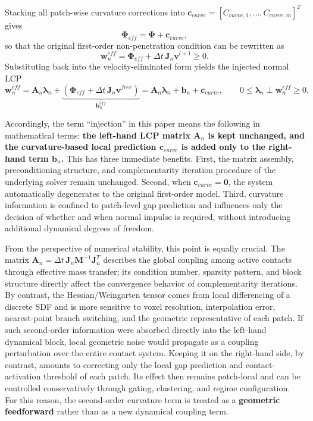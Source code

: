 Stacking all patch-wise curvature corrections into $\mathbf{c}_{curve}=[C_{curve,1},\ldots,C_{curve,m}]^T$ gives
\begin{equation}
    \boldsymbol{\Phi}_{eff} = \boldsymbol{\Phi} + \mathbf{c}_{curve},
\end{equation}
so that the original first-order non-penetration condition can be rewritten as
\begin{equation}
    \mathbf{w}_n^{eff} = \boldsymbol{\Phi}_{eff} + \Delta t\,\mathbf{J}_n \mathbf{v}^{l+1} \ge 0.
\end{equation}
Substituting back into the velocity-eliminated form yields the injected normal LCP
\begin{equation}
    \mathbf{w}_n^{eff}
    =
    \mathbf{A}_n \boldsymbol{\lambda}_n
    +
    \underbrace{\left(\boldsymbol{\Phi}_{eff} + \Delta t\,\mathbf{J}_n \mathbf{v}^{free}\right)}_{\mathbf{b}_n^{eff}}
    =
    \mathbf{A}_n \boldsymbol{\lambda}_n + \mathbf{b}_n + \mathbf{c}_{curve},
    \qquad
    0 \le \boldsymbol{\lambda}_n \perp \mathbf{w}_n^{eff} \ge 0.
\end{equation}

Accordingly, the term ``injection'' in this paper means the following in mathematical terms: \textbf{the left-hand LCP matrix $\mathbf{A}_n$ is kept unchanged, and the curvature-based local prediction $\mathbf{c}_{curve}$ is added only to the right-hand term $\mathbf{b}_n$.} This has three immediate benefits. First, the matrix assembly, preconditioning structure, and complementarity iteration procedure of the underlying solver remain unchanged. Second, when $\mathbf{c}_{curve}=\mathbf{0}$, the system automatically degenerates to the original first-order model. Third, curvature information is confined to patch-level gap prediction and influences only the decision of whether and when normal impulse is required, without introducing additional dynamical degrees of freedom.

From the perspective of numerical stability, this point is equally crucial. The matrix $\mathbf{A}_n=\Delta t\,\mathbf{J}_n\mathbf{M}^{-1}\mathbf{J}_n^T$ describes the global coupling among active contacts through effective mass transfer; its condition number, sparsity pattern, and block structure directly affect the convergence behavior of complementarity iterations. By contrast, the Hessian/Weingarten tensor comes from local differencing of a discrete SDF and is more sensitive to voxel resolution, interpolation error, nearest-point branch switching, and the geometric representative of each patch. If such second-order information were absorbed directly into the left-hand dynamical block, local geometric noise would propagate as a coupling perturbation over the entire contact system. Keeping it on the right-hand side, by contrast, amounts to correcting only the local gap prediction and contact-activation threshold of each patch. Its effect then remains patch-local and can be controlled conservatively through gating, clustering, and regime configuration. For this reason, the second-order curvature term is treated as a \textbf{geometric feedforward} rather than as a new dynamical coupling term.

